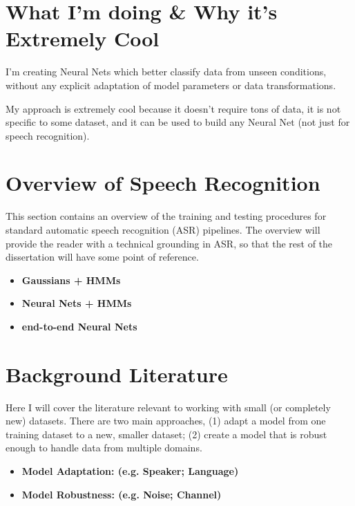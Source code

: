 \documentclass[10pt,a4paper]{article}
\begin{document}
\section{What I'm doing \& Why it's Extremely Cool}

I'm creating Neural Nets which better classify data from unseen conditions, without any explicit adaptation of model parameters or data transformations.

My approach is extremely cool because it doesn't require tons of data, it is not specific to some dataset, and it can be used to build any Neural Net (not just for speech recognition).


\section{Overview of Speech Recognition}

This section contains an overview of the training and testing procedures for standard automatic speech recognition (ASR) pipelines. The overview will provide the reader with a technical grounding in ASR, so that the rest of the dissertation will have some point of reference. 


\begin{itemize}

\item \textbf{Gaussians + HMMs}
  
\item \textbf{Neural Nets + HMMs}
  
\item \textbf{end-to-end Neural Nets}

\end{itemize}


\section{Background Literature}

Here I will cover the literature relevant to working with small (or completely new) datasets. There are two main approaches, (1) adapt a model from one training dataset to a new, smaller dataset; (2) create a model that is robust enough to handle data from multiple domains. 

\begin{itemize}

\item \textbf{Model Adaptation: (e.g. Speaker; Language)}

    
  
\item \textbf{Model Robustness: (e.g. Noise; Channel)}

  
\end{itemize}
\end{document}
